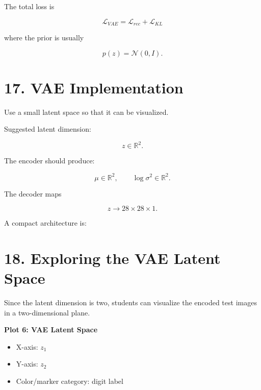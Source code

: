 \documentclass[10pt]{article}
\begin{document}
The total loss is

\[
\boxed{
\mathcal{L}_{VAE}
=
\mathcal{L}_{rec}
+
\mathcal{L}_{KL}
}
\]

where the prior is usually

\[
p(z)=\mathcal{N}(0,I).
\]

\section*{17. VAE Implementation}

Use a small latent space so that it can be visualized.

Suggested latent dimension:

\[
z\in\mathbb{R}^{2}.
\]

The encoder should produce:

\[
\mu\in\mathbb{R}^{2},
\qquad
\log\sigma^2\in\mathbb{R}^{2}.
\]

The decoder maps

\[
z\rightarrow28\times28\times1.
\]

A compact architecture is:

\begin{center}
\end{center}

\section*{18. Exploring the VAE Latent Space}

Since the latent dimension is two, students can visualize the encoded test
images in a two-dimensional plane.

\textbf{Plot 6: VAE Latent Space}

\begin{itemize}
\item X-axis: $z_1$
\item Y-axis: $z_2$
\item Color/marker category: digit label
\end{itemize}
\end{document}
